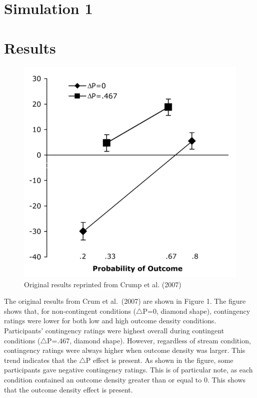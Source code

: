 \documentclass[
  english,
  man,floatsintext]{apa6}
\begin{document}
\hypertarget{simulation-1}{%
\section{Simulation 1}\label{simulation-1}}

\hypertarget{results}{%
\section{Results}\label{results}}

\begin{figure}
\centering
\includegraphics{imgs/crump_results.png}
\caption{\label{fig:unnamed-chunk-3}Original results reprinted from Crump et al. (2007)}
\end{figure}

The original results from Crum et al.~(2007) are shown in Figure 1. The figure shows that, for non-contingent conditions (\(\triangle\)P=0, diamond shape), contingency ratings were lower for both low and high outcome density conditions. Participants' contingency ratings were highest overall during contingent conditions (\(\triangle\)P=.467, diamond shape). However, regardless of stream condition, contingency ratings were always higher when outcome density was larger. This trend indicates that the \(\triangle\)P effect is present. As shown in the figure, some participants gave negative contingency ratings. This is of particular note, as each condition contained an outcome density greater than or equal to 0. This shows that the outcome density effect is present.
\end{document}
